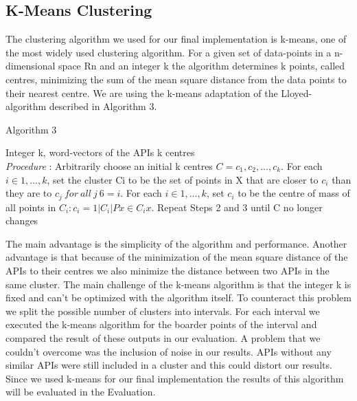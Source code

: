 \documentclass[a4paper]{IEEEtran}
\begin{document}
\subsection{K-Means Clustering}
The clustering algorithm we used for our final implementation is k-means, one of the most widely used clustering algorithm. For a given set of data-points in a n-dimensional space Rn and an integer k the algorithm determines k points, called centres, minimizing the sum of the mean square distance from the data points to their nearest centre. We are using the k-means adaptation of the Lloyed-algorithm described in Algorithm 3.

\begin{algorithm}[H]
 \caption{Algorithm 3}
 \begin{algorithmic}[1]
\renewcommand{\algorithmicrequire}{\textbf{Input:}}
 \renewcommand{\algorithmicensure}{\textbf{Output:}}
 \REQUIRE Integer k, word-vectors of the APIs
 \ENSURE  k centres
 \\ \textit{Procedure} :
  \STATE Arbitrarily choose an initial k centres $C = {c_1, c_2, ..., c_k}$.
 \STATE For each $i \in {1, ..., k}$, set the cluster Ci to be the set of points in X that are closer to $c_i$ than
they are to $c_j~for ~all ~j ~6= i$.
\STATE For each $i \in {1, . . . , k}$, set $c_i$ to be the centre of mass of all points in $C_i : c_i = 1 |C_i| P x \in C_i x$.
\STATE Repeat Steps 2 and 3 until C no longer changes %

 \end{algorithmic}
 \end{algorithm}

The main advantage is the simplicity of the algorithm and performance. Another advantage is that because of the minimization of the mean square distance of the APIs to their centres we also minimize the distance between two APIs in the same cluster.
The main challenge of the k-means algorithm is that the integer k is fixed and can’t be optimized with the algorithm itself. To counteract this problem we split the possible number of clusters into intervals. For each interval we executed the k-means algorithm for the boarder points of the interval and compared the result of these outputs in our evaluation.
A problem that we couldn’t overcome was the inclusion of noise in our results. APIs without any similar APIs were still included in a cluster and this could distort our results.
Since we used k-means for our final implementation the results of this algorithm will be evaluated in the Evaluation.
\end{document}
